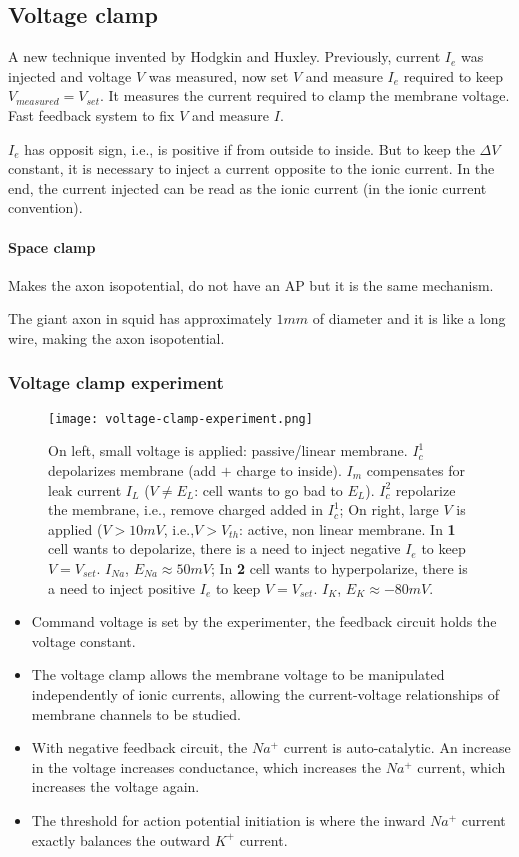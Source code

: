 \documentclass[main]{subfiles}
\begin{document}
\subsection{Voltage clamp}
A new technique invented by Hodgkin and Huxley. Previously, current $I_e$ was injected and voltage $V$ was measured, now set $V$ and measure $I_e$ required  to keep $V_{measured} = V_{set}$.
It measures the current required to clamp the membrane voltage. Fast feedback system to fix $V$ and measure $I$.

$I_e$ has opposit sign, i.e., is positive if from outside to inside. But to keep the $\Delta V$ constant, it is necessary to inject a current opposite to the ionic current. In the end, the current injected can be read as the ionic current (in the ionic current convention).

\paragraph{Space clamp} Makes the axon isopotential, do not have an AP but it is the same mechanism.

The giant axon in squid has approximately $1mm$ of diameter and it is like a long wire, making the axon isopotential.

\subsubsection{Voltage clamp experiment}

\begin{figure}[H]
	\centering
	\texttt{[image: voltage-clamp-experiment.png]}
	\caption{On left, small voltage is applied: passive/linear membrane. $I_c^1$ depolarizes membrane (add $+$ charge to inside). $I_m$ compensates for leak current $I_L$ ($V \neq E_L$: cell wants to go bad to $E_L$). $I_c^2$ repolarize the membrane, i.e., remove charged added in $I_c^1$; On right, large $V$ is applied ($V > 10 mV$, i.e.,$V > V_{th}$: active, non linear membrane. In \textbf{1} cell wants to depolarize, there is a need to inject negative $I_e$ to keep $V = V_{set}$. $I_{Na}$, $E_{Na} \approx 50mV$; In \textbf{2} cell wants to hyperpolarize, there is a need to inject positive $I_e$ to keep $V = V_{set}$. $I_K$, $E_K \approx -80mV$.}
\end{figure}

\begin{itemize}[noitemsep,nolistsep]
	\item Command voltage is set by the experimenter, the feedback circuit holds the voltage constant.
	\item The voltage clamp allows the membrane voltage to be manipulated independently of ionic currents, allowing the current-voltage relationships of membrane channels to be studied.
	\item With negative feedback circuit, the $Na^+$ current is auto-catalytic. An increase in the voltage increases conductance, which increases the $Na^+$ current, which increases the voltage again.
	\item The threshold for action potential initiation is where the inward $Na^+$ current exactly balances the outward $K^+$ current.
\end{itemize}
\end{document}
